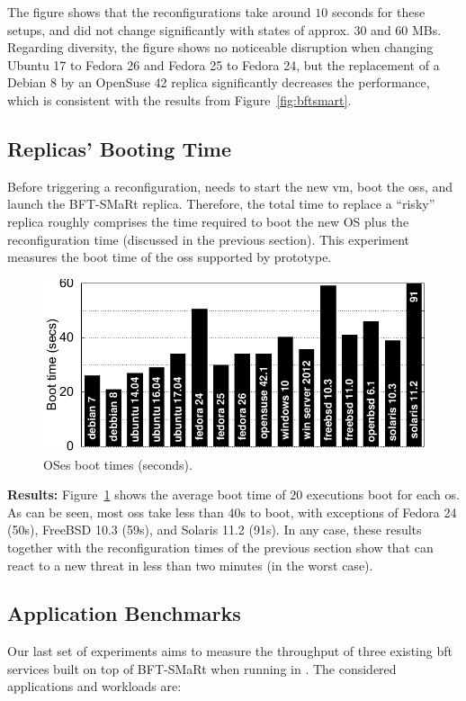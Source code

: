 The figure shows that the reconfigurations take around $10$ seconds for these setups, and did not change significantly with states of approx. $30$ and $60$ MBs.
Regarding diversity, the figure shows no noticeable disruption when changing Ubuntu 17 to Fedora 26 and Fedora 25 to Fedora 24, but the replacement of a Debian 8 by an OpenSuse 42 replica significantly decreases the performance, which is consistent with the results from Figure~\ref{fig:bftsmart}.

\subsection{Replicas' Booting Time}

Before triggering a reconfiguration, \system needs to start the new \gls{vm}, boot the \glspl{os}, and launch the BFT-SMaRt replica.
Therefore, the total time to replace a ``risky'' replica roughly comprises the time required to boot the new OS plus the reconfiguration time (discussed in the previous section).
This experiment measures the boot time of the \glspl{os} supported by \system prototype. 

\begin{figure}[h]
\begin{center}
\includegraphics[width=.8\columnwidth]{images/gnuplot/vagrant/updown/boot.pdf}
\vspace{-5mm}
\caption{OSes boot times (seconds).}
\label{fig:boot}
\end{center}
\end{figure}

\textbf{Results:}
Figure~\ref{fig:boot} shows the average boot time of $20$ executions boot for each \gls{os}.
As can be seen, most \glspl{os} take less than 40s to boot, with exceptions of Fedora 24 (50s), FreeBSD 10.3 (59s), and Solaris 11.2 (91s).
In any case, these results together with the reconfiguration times of the previous section show that \system can react to a new threat in less than two minutes (in the worst case).

\subsection{Application Benchmarks}
Our last set of experiments aims to measure the throughput of three existing \gls{bft} services built on top of BFT-SMaRt when running in \system.
The considered applications and workloads are:

